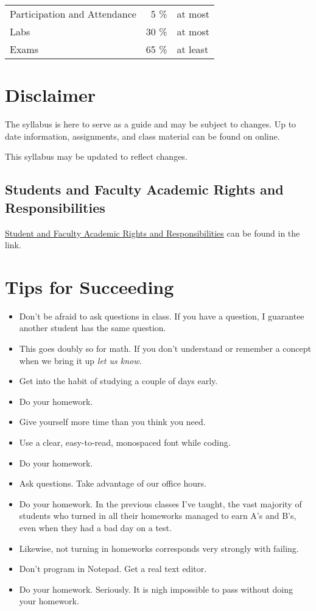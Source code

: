\documentclass[10pt, letter]{article}
\begin{document}
\begin{tabular}{ l  r l}
	Participation and Attendance & 5 \% & at most \\
	Labs & 30 \% & at most \\
	Exams & 65 \% & at least \\
\end{tabular}

\section*{Disclaimer}
The syllabus is here to serve as a guide and may be subject to changes.  Up to date information, assignments, and class material can be found on online.

This syllabus may be updated to reflect changes.


\subsection*{Students and Faculty Academic Rights and Responsibilities}
\href{http://policies.temple.edu/PDF/99.pdf}{Student and Faculty Academic Rights and Responsibilities} can be found in the link.


\section*{Tips for Succeeding}
\begin{itemize}
	\item Don't be afraid to ask questions in class.  If you have a question, I guarantee another student has the same question.  
	\item This goes doubly so for math.  If you don't understand or remember a concept when we bring it up \emph{let us know.}
	\item Get into the habit of studying a couple of days early.
	\item Do your homework.
	\item Give yourself more time than you think you need.
	\item Use a clear, easy-to-read, monospaced font while coding.
	\item Do your homework.
	\item Ask questions.  Take advantage of our office hours.
	\item Do your homework.  In the previous classes I've taught, the vast majority of students who turned in all their homeworks managed to earn A's and B's, even when they had a bad day on a test.
	\item Likewise, not turning in homeworks corresponds very strongly with failing.
	\item Don't program in Notepad.  Get a real text editor.
	\item Do your homework. Seriously.  It is nigh impossible to pass without doing your homework.
	
	
\end{itemize}
\end{document}

